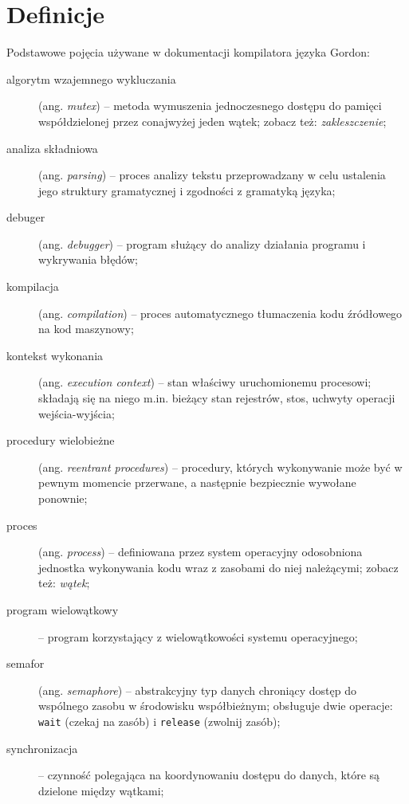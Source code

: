 \documentclass[12pt,leqno, twoside]{mwart}
\begin{document}
\section{Definicje}
\noindent Podstawowe pojęcia używane w dokumentacji kompilatora języka Gordon:
\\
\begin{description}
    \item[algorytm wzajemnego wykluczania] (ang. \emph{mutex}) -- metoda wymuszenia jednoczesnego dostępu do pamięci współdzielonej przez conajwyżej jeden wątek; zobacz też: \emph{zakleszczenie};\\
    \item[analiza składniowa] (ang. \emph{parsing}) -- proces analizy tekstu przeprowadzany w celu ustalenia jego struktury gramatycznej i zgodności z gramatyką języka;\\
    \item[debuger] (ang. \emph{debugger}) -- program służący do analizy działania programu i wykrywania błędów;\\
    \item[kompilacja] (ang. \emph{compilation}) -- proces automatycznego tłumaczenia kodu źródłowego na kod maszynowy;\\
    \item[kontekst wykonania] (ang. \emph{execution context}) -- stan właściwy uruchomionemu procesowi; składają się na niego m.in. bieżący stan rejestrów, stos, uchwyty operacji wejścia-wyjścia;\\
    \item[procedury wielobieżne] (ang. \emph{reentrant procedures}) -- procedury, których wykonywanie może być w pewnym momencie przerwane, a następnie bezpiecznie wywołane ponownie;\\
    \item[proces] (ang. \emph{process}) -- definiowana przez system operacyjny odosobniona jednostka wykonywania kodu wraz z zasobami do niej należącymi; zobacz też: \emph{wątek};\\
    \item[program wielowątkowy] -- program korzystający z wielowątkowości systemu operacyjnego;\\
    \item[semafor] (ang. \emph{semaphore}) -- abstrakcyjny typ danych chroniący dostęp do wspólnego zasobu w środowisku współbieżnym; obsługuje dwie operacje: \texttt{wait} (czekaj na zasób) i \texttt{release} (zwolnij zasób);\\
    \item[synchronizacja] -- czynność polegająca na koordynowaniu dostępu do danych, które są dzielone między wątkami;\\

\end{description}
\end{document}
